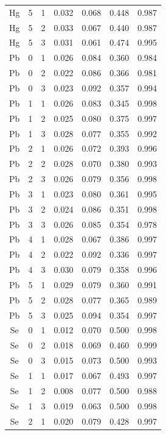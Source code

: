 \documentclass[ms, hidelinks]{uncgdissertationexp3}
\theoremstyle{plain}
\theoremstyle{definition}
\theoremstyle{remark}
\begin{document}
\begin{longtable}{ccccccc}
  Hg & 5 & 1 & 0.032 & 0.068 & 0.448 & 0.987\\
  \rowcolor{gray!6}  Hg & 5 & 2 & 0.033 & 0.067 & 0.440 & 0.987\\
  Hg & 5 & 3 & 0.031 & 0.061 & 0.474 & 0.995\\
  \rowcolor{gray!6}  Pb & 0 & 1 & 0.026 & 0.084 & 0.360 & 0.984\\
  Pb & 0 & 2 & 0.022 & 0.086 & 0.366 & 0.981\\
  \rowcolor{gray!6}  Pb & 0 & 3 & 0.023 & 0.092 & 0.357 & 0.994\\
  Pb & 1 & 1 & 0.026 & 0.083 & 0.345 & 0.998\\
  \rowcolor{gray!6}  Pb & 1 & 2 & 0.025 & 0.080 & 0.375 & 0.997\\
  Pb & 1 & 3 & 0.028 & 0.077 & 0.355 & 0.992\\
  \rowcolor{gray!6}  Pb & 2 & 1 & 0.026 & 0.072 & 0.393 & 0.996\\
  Pb & 2 & 2 & 0.028 & 0.070 & 0.380 & 0.993\\
  \rowcolor{gray!6}  Pb & 2 & 3 & 0.026 & 0.079 & 0.356 & 0.998\\
  Pb & 3 & 1 & 0.023 & 0.080 & 0.361 & 0.995\\
  \rowcolor{gray!6}  Pb & 3 & 2 & 0.024 & 0.086 & 0.351 & 0.998\\
  Pb & 3 & 3 & 0.026 & 0.085 & 0.354 & 0.978\\
  \rowcolor{gray!6}  Pb & 4 & 1 & 0.028 & 0.067 & 0.386 & 0.997\\
  Pb & 4 & 2 & 0.022 & 0.092 & 0.336 & 0.997\\
  \rowcolor{gray!6}  Pb & 4 & 3 & 0.030 & 0.079 & 0.358 & 0.996\\
  Pb & 5 & 1 & 0.029 & 0.079 & 0.360 & 0.991\\
  \rowcolor{gray!6}  Pb & 5 & 2 & 0.028 & 0.077 & 0.365 & 0.989\\
  Pb & 5 & 3 & 0.025 & 0.094 & 0.354 & 0.997\\
  \rowcolor{gray!6}  Se & 0 & 1 & 0.012 & 0.070 & 0.500 & 0.998\\
  Se & 0 & 2 & 0.018 & 0.069 & 0.460 & 0.999\\
  \rowcolor{gray!6}  Se & 0 & 3 & 0.015 & 0.073 & 0.500 & 0.993\\
  Se & 1 & 1 & 0.017 & 0.067 & 0.493 & 0.997\\
  \rowcolor{gray!6}  Se & 1 & 2 & 0.008 & 0.077 & 0.500 & 0.988\\
  Se & 1 & 3 & 0.019 & 0.063 & 0.500 & 0.998\\
  \rowcolor{gray!6}  Se & 2 & 1 & 0.020 & 0.079 & 0.428 & 0.997\\

\end{longtable}
\end{document}
